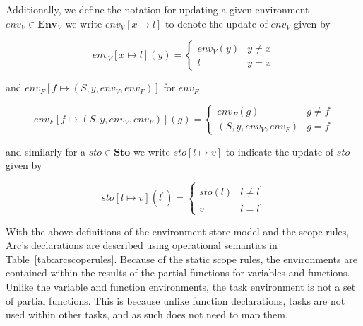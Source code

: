 Additionally, we define the notation for updating a given environment $env_V \in \textbf{Env}_V$ we write $env_V[ x \mapsto l]$ to denote the update of $env_V$ given by


\begin{equation}
    env_V[x \mapsto l](y) =
    \begin{cases}
        env_V(y) & y \neq x \\
        l        & y = x
    \end{cases}
\end{equation}


\noindent and $env_F[ f \mapsto (S, y, env_V, env_F)]$ for $env_F$


\begin{equation}
    env_F[f \mapsto (S, y, env_V, env_F)](g) =
    \begin{cases}
        env_F(g)             & g \neq f \\
        (S, y, env_V, env_F) & g = f
    \end{cases}
\end{equation}


\noindent and similarly for a $sto \in \textbf{Sto}$ we write $sto[ l \mapsto v ]$ to indicate the update of $sto$ given by


\begin{equation}
    sto[l \mapsto v](l^\prime) =
    \begin{cases}
        sto(l) & l \neq l^\prime \\
        v      & l = l^\prime
    \end{cases}
\end{equation}

\noindent With the above definitions of the environment store model and the scope rules, Arc's declarations are described using operational semantics in Table~\ref{tab:arcscoperules}. Because of the static scope rules, the environments are contained within the results of the partial functions for variables and functions. Unlike the variable and function environments, the task environment is not a set of partial functions. This is because unlike function declarations, tasks are not used within other tasks, and as such does not need to map them.


